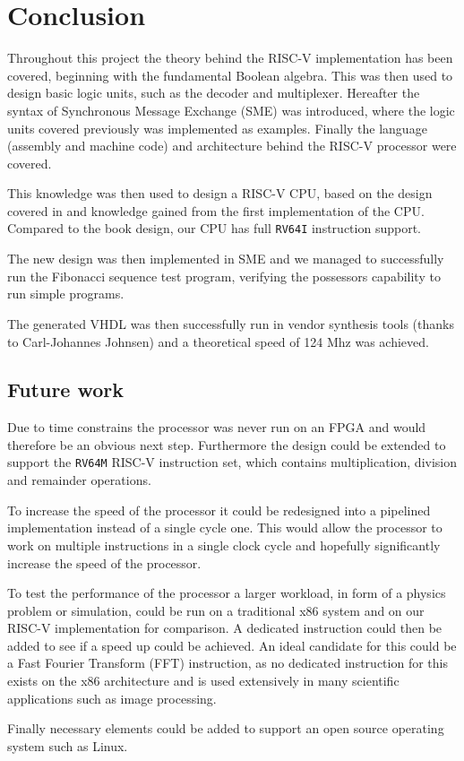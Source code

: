 \chapter{Conclusion}
    Throughout this project the theory behind the RISC-V implementation has been covered, beginning with the fundamental Boolean algebra. This was then used to design basic logic units, such as the decoder and multiplexer. Hereafter the syntax of Synchronous Message Exchange (SME) was introduced, where the logic units covered previously was implemented as examples.
    Finally the language (assembly and machine code) and architecture behind the RISC-V processor were covered.
    
    
    This knowledge was then used to design a RISC-V CPU, based on the design covered in \cite{riscVbook} and knowledge gained from the first implementation of the CPU.  
    Compared to the book design, our CPU has full \texttt{RV64I} instruction support.
    
    The new design was then implemented in SME and we managed to successfully run the Fibonacci sequence test program, verifying the possessors capability to run simple programs. 
    
    The generated VHDL was then successfully run in vendor synthesis tools (thanks to Carl-Johannes Johnsen) and a theoretical speed of 124 Mhz was achieved.   
    
    \section{Future work}

    Due to time constrains the processor was never run on an FPGA and would therefore be an obvious next step. Furthermore the design could be extended to support the \texttt{RV64M} RISC-V instruction set, which contains multiplication, division and remainder operations.
    
    To increase the speed of the processor it could be redesigned into a pipelined implementation instead of a single cycle one. This would allow the processor to work on multiple instructions in a single clock cycle and hopefully significantly increase the speed of the processor.
    
    To test the performance of the processor a larger workload, in form of a physics problem or simulation, could be run on a traditional x86 system and on our RISC-V implementation for comparison. A dedicated instruction could then be added to see if a speed up could be achieved. An ideal candidate for this could be a Fast Fourier Transform (FFT) instruction, as no dedicated instruction for this exists on the x86 architecture and is used extensively in many scientific applications such as image processing.
    
    Finally necessary elements could be added to support an open source operating system such as Linux.

